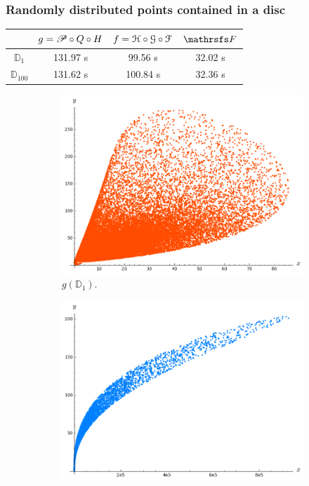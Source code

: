 \documentclass{beamer}
\begin{document}
\begin{frame}
\frametitle{Randomly distributed points contained in a disc}
\begin{table}[ht!]
\begin{center}
\begin{tabular}{c || c | c | c}
& $g = \P\circ Q \circ H$ & $f=\HH\circ\GG\circ\FF$ & $\FFF$ \\ \hline \hline
${\mathbb D}_1$ & 131.97 s & 99.56 s & 32.02 s \\ \hline
${\mathbb D}_{100}$ & 131.62 s & 100.84 s & 32.36 s \\
\end{tabular}
\end{center}
\end{table}

\begin{figure}
\vspace{-0.25cm}
\begin{subfigure}{.32\linewidth}\centering
\includegraphics[width=1\textwidth]{plots/ch5_35_disc1.png}
\caption{$g({\mathbb D}_1)$.}
\end{subfigure}
\begin{subfigure}{.32\linewidth}\centering
\includegraphics[width=1\textwidth]{plots/ch5_37_disc2.png}

\end{subfigure}
\end{figure}
\end{frame}
\end{document}
